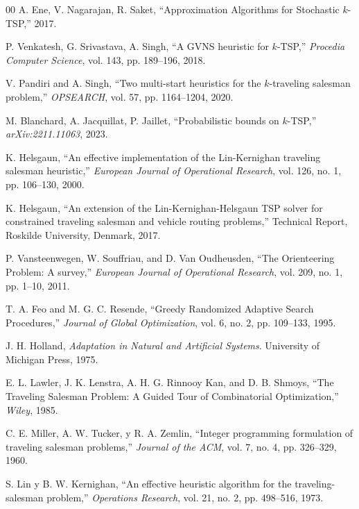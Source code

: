 \documentclass[conference]{IEEEtran}
\begin{document}
\begin{thebibliography}{00}
 A. Ene, V. Nagarajan, R. Saket, 
``Approximation Algorithms for Stochastic $k$-TSP,'' 2017.

 P. Venkatesh, G. Srivastava, A. Singh, 
``A GVNS heuristic for $k$-TSP,'' 
\textit{Procedia Computer Science}, vol. 143, pp. 189--196, 2018.

 V. Pandiri and A. Singh, 
``Two multi-start heuristics for the $k$-traveling salesman problem,'' 
\textit{OPSEARCH}, vol. 57, pp. 1164--1204, 2020.

 M. Blanchard, A. Jacquillat, P. Jaillet, 
``Probabilistic bounds on $k$-TSP,'' 
\textit{arXiv:2211.11063}, 2023.

 K. Helsgaun, 
``An effective implementation of the Lin-Kernighan traveling salesman heuristic,'' 
\textit{European Journal of Operational Research}, vol. 126, no. 1, pp. 106--130, 2000.

 K. Helsgaun, 
``An extension of the Lin-Kernighan-Helsgaun TSP solver for constrained traveling salesman and vehicle routing problems,'' 
Technical Report, Roskilde University, Denmark, 2017.

 P. Vansteenwegen, W. Souffriau, and D. Van Oudheusden, 
``The Orienteering Problem: A survey,'' 
\textit{European Journal of Operational Research}, vol. 209, no. 1, pp. 1--10, 2011.

 T. A. Feo and M. G. C. Resende, 
``Greedy Randomized Adaptive Search Procedures,'' 
\textit{Journal of Global Optimization}, vol. 6, no. 2, pp. 109--133, 1995.

 J. H. Holland, 
\textit{Adaptation in Natural and Artificial Systems}. University of Michigan Press, 1975.

 E. L. Lawler, J. K. Lenstra, A. H. G. Rinnooy Kan, and D. B. Shmoys, 
``The Traveling Salesman Problem: A Guided Tour of Combinatorial Optimization,'' 
\textit{Wiley}, 1985.

 C. E. Miller, A. W. Tucker, y R. A. Zemlin, 
``Integer programming formulation of traveling salesman problems,'' 
\textit{Journal of the ACM}, vol. 7, no. 4, pp. 326--329, 1960.

 S. Lin y B. W. Kernighan, 
``An effective heuristic algorithm for the traveling-salesman problem,'' 
\textit{Operations Research}, vol. 21, no. 2, pp. 498--516, 1973.


\end{thebibliography}
\end{document}
